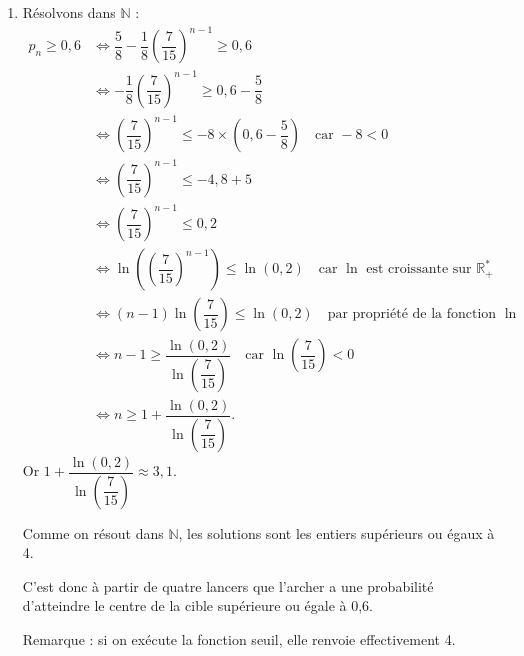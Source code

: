 \documentclass[10pt]{article}
\providecommand{\R}{\mathbb{R}}
\providecommand{\N}{\mathbb{N}}
\begin{document}
\begin{enumerate}
\item Résolvons dans $\N$ :
\[
\begin{aligned}
p_n\geq 0,6&\Longleftrightarrow \dfrac58-\dfrac18\left(\dfrac7{15}\right)^{n-1}\geq 0,6\\
&\Longleftrightarrow -\dfrac18\left(\dfrac7{15}\right)^{n-1}\geq 0,6-\dfrac58\\
&\Longleftrightarrow \left(\dfrac7{15}\right)^{n-1}\leq -8\times \left(0,6-\dfrac58\right) \quad \text{car } -8<0\\
&\Longleftrightarrow \left(\dfrac7{15}\right)^{n-1}\leq -4,8+5\\
&\Longleftrightarrow \left(\dfrac7{15}\right)^{n-1}\leq 0,2\\
&\Longleftrightarrow \ln\left(\left(\dfrac7{15}\right)^{n-1}\right)\leq \ln(0,2) \quad \text{car } \ln \text{ est croissante sur }\R^{*}_{+}\\
&\Longleftrightarrow (n-1)\ln\left(\dfrac7{15}\right)\leq \ln(0,2) \quad \text{par propriété de la fonction }\ln\\
&\Longleftrightarrow n-1\geq \dfrac{\ln(0,2)}{\ln\left(\dfrac7{15}\right)} \quad \text{car } \ln\left(\dfrac7{15}\right)<0\\
&\Longleftrightarrow n\geq 1+\dfrac{\ln(0,2)}{\ln\left(\dfrac7{15}\right)}.
\end{aligned}
\]
Or $1+\dfrac{\ln(0,2)}{\ln\left(\dfrac7{15}\right)}\approx 3,1$.

Comme on résout dans $\N$, les solutions sont les entiers supérieurs ou égaux à 4.

C'est donc à partir de quatre lancers que l'archer a une probabilité d'atteindre le centre de la cible supérieure ou égale à 0,6.

Remarque : si on exécute la fonction seuil, elle renvoie effectivement 4.
\end{enumerate}
\end{document}

